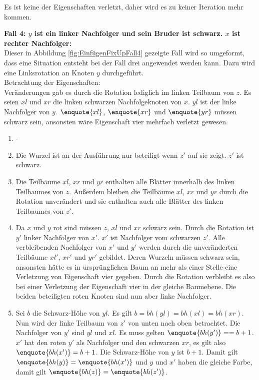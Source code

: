 \documentclass[a4paper,12pt]{article}
\begin{document}
\noindent Es ist keine der Eigenschaften verletzt, daher wird es zu keiner Iteration mehr kommen.


\noindent\textbf{Fall 4: $y$ ist ein linker Nachfolger und sein Bruder ist schwarz. $x$ ist rechter Nachfolger: }\\      
Dieser in Abbildung \ref{fig:EinfügenFixUpFall4} gezeigte Fall wird so umgeformt, dass eine Situation entsteht bei der Fall drei angewendet werden kann. Dazu wird eine Linksrotation an Knoten $y$ durchgeführt.\\

\noindent Betrachtung der Eigenschaften:\\
Veränderungen gab es durch die Rotation lediglich im linken Teilbaum von $z$. Es seien $\mathit{xl}$ und $\mathit{xr}$ die linken schwarzen Nachfolgeknoten von $x$. $\mathit{yl}$ ist der linke Nachfolger von $y$. $\enquote{xl}$, $\enquote{xr}$ und $\enquote{yr}$ müssen schwarz sein, ansonsten wäre Eigenschaft vier mehrfach verletzt gewesen.
\begin{enumerate}
	\item -
	\item Die Wurzel ist an der Ausführung nur beteiligt wenn $z'$ auf sie zeigt. $z'$ ist schwarz.
	\item  Die Teilbäume  $\mathit{xl}$, $\mathit{xr}$ und $\mathit{yr}$ enthalten alle Blätter innerhalb des linken Teilbaumes von $z$. Außerdem bleiben die Teilbäume  $\mathit{xl}$, $\mathit{xr}$ und $\mathit{yr}$ durch die Rotation unverändert und sie enthalten auch alle Blätter des linken Teilbaumes von $z'$.
	\item Da $x$ und $y$ rot sind müssen $z$, $\mathit{xl}$ und $\mathit{xr}$ schwarz sein. Durch die Rotation ist $y'$ linker Nachfolger von $x'$. $x'$ ist Nachfolger vom schwarzen $z'$. Alle verbleibenden Nachfolger von $x'$ und $y'$ werden durch die unveränderten Teilbäume $\mathit{xl'}$, $\mathit{xr'}$ und $\mathit{yr'}$ gebildet. Deren Wurzeln müssen schwarz sein, ansonsten hätte es in ursprünglichen Baum an mehr als einer Stelle eine Verletzung von Eigenschaft vier gegeben. Durch die Rotation verbleibt es also bei einer Verletzung der Eigenschaft vier in der gleiche Baumebene. Die beiden beteiligten roten Knoten sind nun aber linke Nachfolger.   
	\item Sei $b$ die Schwarz-Höhe von $yl$. Es gilt $b = \mathit{bh(yl)} = \mathit{bh(xl)} = \mathit{bh(xr)}$. Nun wird der linke Teilbaum von $z'$ von unten nach oben betrachtet. Die Nachfolger von $y'$ sind $yl$ und $xl$. Es muss gelten $\enquote{bh(y')} = = b + 1$. $x'$ hat den roten $y'$ als Nachfolger und den schwarzen $xr$, es gilt also $\enquote{bh(x')} = b + 1$. Die Schwarz-Höhe von $y$ ist $b +1$. Damit gilt $\enquote{bh(y)} = \enquote{bh(x')}$ und $y$ und $x'$ haben die gleiche Farbe, damit gilt $\enquote{bh(z)} = \enquote{bh(z')}$.
\end{enumerate}  
\end{document}
